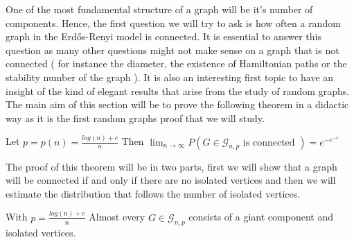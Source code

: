 One of the most fundamental structure of a graph will be it's number of components. Hence, the first question we will try to ask is how often a random graph in the Erd\H{o}s-Renyi model is connected. It is essential to answer this question as many other questions might not make sense on a graph that is not connected ( for instance the diameter, the existence of Hamiltonian paths or the stability number of the graph ). 
\newline
It is also an interesting first topic to have an insight of the kind of elegant results that arise from the study of random graphs. The main aim of this section will be to prove the following theorem in a didactic way as it is the first random graphs proof that we will study.
\begin{theorem}\label{th:connect}
Let $p = p(n) = \frac{log(n) + c}{n}$
\newline
Then $\lim_{n \to \infty} P(G \in \mathcal{G}_{n, p}\text{ is connected }) = e^{-e^{-c}}$ 
\end{theorem}
The proof of this theorem will be in two parts, first we will show that a graph will be connected if and only if there are no isolated vertices and then we will estimate the distribution that follows the number of isolated vertices.
\begin{theorem}\label{th:isolcomp}
	With $p = \frac{log(n) + c}{n}$
	 Almost every $G \in \mathcal{G}_{n, p}$ consists of a giant component and isolated vertices. 
\end{theorem}
